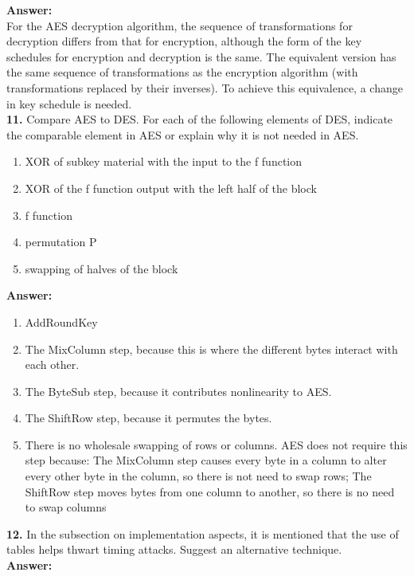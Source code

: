 \documentclass[paper=a4, fontsize=11pt]{scrartcl} %
\numberwithin{equation}{section} %
\numberwithin{figure}{section} %
\numberwithin{table}{section} %
\begin{document}
\textbf{Answer:}\\

For the AES decryption algorithm, the sequence of transformations for decryption differs from that for encryption, although the form of the key schedules for encryption and decryption is the same. The equivalent version has the same sequence of transformations as the encryption algorithm (with transformations replaced by their inverses). To achieve this equivalence, a change in key schedule is needed.\\


\textbf{11.} Compare AES to DES. For each of the following elements of DES, indicate the comparable element in AES or explain why it is not needed in AES.
\begin{enumerate}
\renewcommand\theenumi{\alph{enumi}}
\item XOR of subkey material with the input to the f function
\item XOR of the f function output with the left half of the block
\item f function
\item permutation P
\item swapping of halves of the block
\end{enumerate}

\textbf{Answer:}\\
\begin{enumerate}
\renewcommand\theenumi{\alph{enumi}}
\item AddRoundKey
\item The MixColumn step, because this is where the different bytes interact with each other.
\item The ByteSub step, because it contributes nonlinearity to AES.
\item The ShiftRow step, because it permutes the bytes.
\item There is no wholesale swapping of rows or columns. AES does not require this step because: The MixColumn step causes every byte in a column to alter every other byte in the column, so there is not need to swap rows; The ShiftRow step moves bytes from one column to another, so there is no need to swap columns
\end{enumerate}

\textbf{12.} In the subsection on implementation aspects, it is mentioned that the use of tables helps thwart timing attacks. Suggest an alternative technique.\\

\textbf{Answer:}\\
\end{document}
